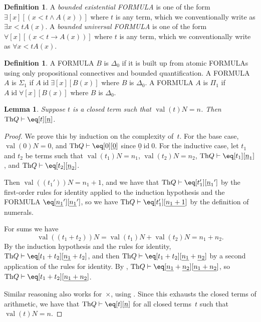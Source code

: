 \documentclass[10pt,a4paper]{article}
\makeatletter
\newcommand*{\olup}[1]{\MakeUppercase{#1}}
\theoremstyle{plain}
\newtheorem{lem}[thm]{Lemma}
\theoremstyle{definition}
\newtheorem{defn}[thm]{Definition}
\theoremstyle{remark}
\newcommand*{\ollabel}[1]{\label{#1}}
\newcommand{\olref}{\@ifnextchar[{\olref@i}{\olref@final}}
\def\olref@i[#1]{\@ifnextchar[{\olref@ii}{\olref@final}}
\def\olref@ii[#1]{\@ifnextchar[{\olref@iii}{\olref@final}}
\def\olref@iii[#1]{\olref@final}
\def\olref@final#1{\ref{#1}}
\providecommand{\lif}{\mathbin{\rightarrow}}
\providecommand{\lforall}{\mathord{\forall}}
\providecommand{\lexists}{\mathord{\exists}}
\providecommand{\Proves}{\mathrel{\vdash}}
\providecommand{\Obj}{}
\providecommand{\Th}{\ensuremath{\mathrm{Th}}}
\providecommand{\num}[1]{\underline{#1}}
\providecommand{\Value}[1]{\operatorname{val}(#1)}
\providecommand{\bforall}{\forall}
\providecommand{\bexists}{\exists}
\providecommand{\ident}{\operatorname{id}}
\makeatother
\begin{document}
\begin{defn}
\ollabel{defn:bd-quant}
A \emph{bounded existential \olup{formula}} is one of the form
$\lexists[x][(x < t \land A(x))]$ where $t$ is any term, which we
conventionally write as $\bexists{x < t}{A(x)}$.
%
A \emph{bounded universal \olup{formula}} is one of the form
$\lforall[x][(x < t \lif A(x))]$ where $t$ is any term, which we
conventionally write as $\bforall{x < t}{A(x)}$.
\end{defn}

\begin{defn}
\ollabel{defn:delta0-sigma1-pi1-frm}
A \olup{formula} $B$ is $\Delta_0$ if it is built up from atomic
\olup{formula}s using only propositional connectives and bounded
quantification.
%
A \olup{formula} $A$ is $\Sigma_1$ if $A \ident \lexists[x][B(x)]$
where $B$ is $\Delta_0$.
%
A \olup{formula} $A$ is $\Pi_1$ if $A \ident \lforall[x][B(x)]$
where $B$ is $\Delta_0$.
\end{defn}

\begin{lem}
\ollabel{lem:q-proves-clterm-id} Suppose $t$ is a closed term such that
$\Value{t}{N} = n$. Then $\Th{Q} \Proves \eq[t][\num n]$.
\end{lem}

\begin{proof}
We prove this by induction on the complexity of~$t$. For the base case,
$\Value{\Obj 0}{N} = 0$, and $\Th{Q} \Proves \eq[\Obj 0][\num 0]$
since $\num 0 \ident \Obj 0$.
%
For the inductive case, let $t_1$ and $t_2$ be terms such that
$\Value{t_1}{N} = n_1$, $\Value{t_2}{N} = n_2$,
$\Th{Q} \Proves \eq[t_1][\num n_1]$, and
$\Th{Q} \Proves \eq[t_2][\num n_2]$.

Then $\Value{(t_1')}{N} = n_1 + 1$, and we have that $\Th{Q} \Proves
\eq[t_1'][{\num n_1}']$ by the first-order rules for identity applied
to the induction hypothesis and the \olup{formula}
$\eq[\num{n_1}'][\num{n_1}']$,
so we have $\Th{Q} \Proves \eq[t_1'][\num{n_1 + 1}]$
by the definition of numerals.

For sums we have
\[
      \Value{(t_1 + t_2)}{N}
    = \Value{t_1}{N} + \Value{t_2}{N}
    = n_1 + n_2.
\]
By the induction hypothesis and the rules for identity,
$\Th{Q} \Proves \eq[t_1 + t_2][\num{n_1} + t_2]$, and then
$\Th{Q} \Proves \eq[t_1 + t_2][\num{n_1} + \num{n_2}]$
by a second application of the rules for identity.
By \olref[inc][req][bre]{lem:q-proves-add},
$\Th{Q} \Proves \eq[\num{n_1} + \num{n_2}][\num{n_1 + n_2}]$,
so $\Th{Q} \Proves \eq[t_1 + t_2][\num{n_1 + n_2}]$.

Similar reasoning also works for~$\times$, using
\olref[inc][req][bre]{lem:q-proves-mult}.
%
Since this exhausts the closed terms of arithmetic, we have that
$\Th{Q} \Proves \eq[t][\num n]$ for all closed terms~$t$ such that
$\Value{t}{N} = n$.
\end{proof}
\end{document}
